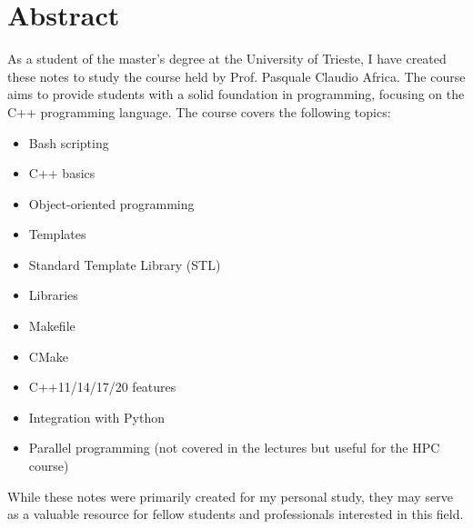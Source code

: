 
\chapter*{Abstract}

As a student of the  master's degree at the University of Trieste, I have created these notes to study the course  held by Prof. Pasquale Claudio Africa. The course aims to provide students with a solid foundation in programming, focusing on the C++ programming language. The course covers the following topics:
\begin{itemize}
    \item Bash scripting
    \item C++ basics
    \item Object-oriented programming
    \item Templates
    \item Standard Template Library (STL)
    \item Libraries
    \item Makefile
    \item CMake
    \item C++11/14/17/20 features
    \item Integration with Python
    \item Parallel programming (not covered in the lectures but useful for the HPC course)
\end{itemize}
While these notes were primarily created for my personal study, they may serve as a valuable resource for fellow students and professionals interested in this field.
